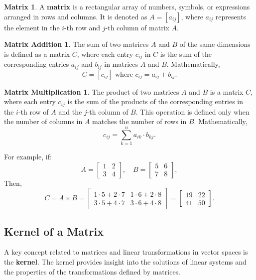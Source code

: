 \theoremstyle{definition}
\newtheorem*{mtx}{Matrix}
\begin{mtx}
A \textbf{matrix} is a rectangular array of numbers, symbols, or expressions arranged in rows and columns. It is denoted as $A = [a_{ij}]$, where $a_{ij}$ represents the element in the $i$-th row and $j$-th column of matrix $A$.
\end{mtx}

\newtheorem*{mxa}{Matrix Addition}
\begin{mxa}
The sum of two matrices $A$ and $B$ of the same dimensions is defined as a matrix $C$, where each entry $c_{ij}$ in $C$ is the sum of the corresponding entries $a_{ij}$ and $b_{ij}$ in matrices $A$ and $B$. Mathematically,
\[
C = [c_{ij}] \text{ where } c_{ij} = a_{ij} + b_{ij}.
\]
\end{mxa}

\newtheorem*{mxm}{Matrix Multiplication}
\begin{mxm}
The product of two matrices $A$ and $B$ is a matrix $C$, where each entry $c_{ij}$ is the sum of the products of the corresponding entries in the $i$-th row of $A$ and the $j$-th column of $B$. This operation is defined only when the number of columns in $A$ matches the number of rows in $B$. Mathematically,
\[
c_{ij} = \sum_{k=1}^{n} a_{ik} \cdot b_{kj}.
\]
\end{mxm}

For example, if:
\[
A = \begin{bmatrix}
1 & 2 \\
3 & 4
\end{bmatrix}, \quad
B = \begin{bmatrix}
5 & 6 \\
7 & 8
\end{bmatrix},
\]
Then,
\[
C = A \times B = \begin{bmatrix}
1 \cdot 5 + 2 \cdot 7 & 1 \cdot 6 + 2 \cdot 8 \\
3 \cdot 5 + 4 \cdot 7 & 3 \cdot 6 + 4 \cdot 8
\end{bmatrix} = \begin{bmatrix}
19 & 22 \\
41 & 50
\end{bmatrix}.
\]

\subsection{Kernel of a Matrix}
A key concept related to matrices and linear transformations in vector spaces is the \textbf{kernel}. The kernel provides insight into the solutions of linear systems and the properties of the transformations defined by matrices.

